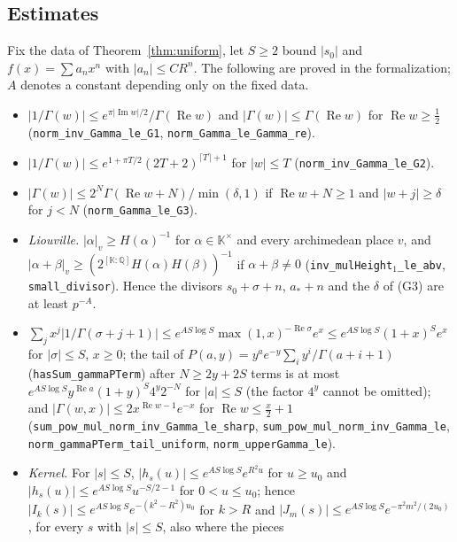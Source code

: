 \documentclass[11pt,reqno]{amsart}
\theoremstyle{definition}
\theoremstyle{remark}
\newcommand{\QQ}{\mathbb{Q}}
\begin{document}
\begin{small}
\subsection{Estimates}\label{app:estimates}
Fix the data of Theorem~\ref{thm:uniform}, let $S \ge 2$ bound $|s_0|$ and $f(x) = \sum a_nx^n$ with
$|a_n| \le CR^n$. The following are proved in the formalization; $A$ denotes a constant depending only on the fixed
data.
\begin{itemize}
\item[(G1)] $|1/\Gamma(w)| \le e^{\pi|\operatorname{Im}w|/2}/\Gamma(\operatorname{Re}w)$ and
$|\Gamma(w)| \le \Gamma(\operatorname{Re}w)$ for $\operatorname{Re}w \ge \frac12$ (\nolinkurl{norm_inv_Gamma_le_G1},
\nolinkurl{norm_Gamma_le_Gamma_re}).
\item[(G2)] $|1/\Gamma(w)| \le e^{1+\pi T/2}(2T+2)^{\lceil T\rceil+1}$ for $|w| \le T$ (\nolinkurl{norm_inv_Gamma_le_G2}).
\item[(G3)] $|\Gamma(w)| \le 2^N\Gamma(\operatorname{Re}w + N)/\min(\delta, 1)$ if $\operatorname{Re}w + N \ge 1$ and
$|w + j| \ge \delta$ for $j < N$ (\nolinkurl{norm_Gamma_le_G3}).
\item[(Li)] \emph{Liouville.} $|\alpha|_v \ge H(\alpha)^{-1}$ for $\alpha \in \mathbb K^\times$ and every archimedean
place $v$, and $|\alpha + \beta|_v \ge (2^{[\mathbb K:\QQ]}H(\alpha)H(\beta))^{-1}$ if $\alpha + \beta \ne 0$
(\nolinkurl{inv_mulHeight}$_1$\nolinkurl{_le_abv}, \nolinkurl{small_divisor}). Hence the divisors $s_0 + \sigma + n$, $a_* + n$ and
the $\delta$ of (G3) are at least $p^{-A}$.
\item[(GS)] $\sum_jx^j|1/\Gamma(\sigma + j + 1)| \le e^{AS\log S}\max(1,x)^{-\operatorname{Re}\sigma}e^x
\le e^{AS\log S}(1+x)^Se^x$ for $|\sigma| \le S$, $x \ge 0$; the tail of
$P(a,y) = y^ae^{-y}\sum_iy^i/\Gamma(a+i+1)$ (\nolinkurl{hasSum_gammaPTerm}) after $N \ge 2y + 2S$ terms is at most
$e^{AS\log S}y^{\operatorname{Re}a}(1+y)^S4^y2^{-N}$ for $|a| \le S$ (the factor $4^y$ cannot be omitted); and
$|\Gamma(w,x)| \le 2x^{\operatorname{Re}w-1}e^{-x}$ for $\operatorname{Re}w \le \frac x2 + 1$
(\nolinkurl{sum_pow_mul_norm_inv_Gamma_le_sharp}, \nolinkurl{sum_pow_mul_norm_inv_Gamma_le},
\nolinkurl{norm_gammaPTerm_tail_uniform}, \nolinkurl{norm_upperGamma_le}).
\item[(KB)] \emph{Kernel.} For $|s| \le S$, $|h_s(u)| \le e^{AS\log S}e^{R^2u}$ for $u \ge u_0$ and
$|h_s(u)| \le e^{AS\log S}u^{-S/2-1}$ for $0 < u \le u_0$; hence $|I_k(s)| \le e^{AS\log S}e^{-(k^2-R^2)u_0}$ for
$k > R$ and $|J_m(s)| \le e^{AS\log S}e^{-\pi^2m^2/(2u_0)}$, for every $s$ with $|s| \le S$, also where the pieces

\end{itemize}
\end{small}
\end{document}

